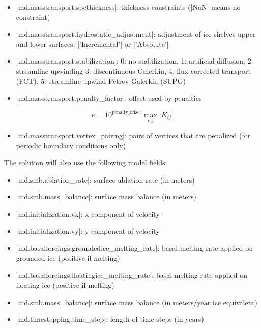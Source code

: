 \begin{itemize}
	\item \lstinlinebg|md.masstransport.spcthickness|: thickness constraints (\lstinlinebg|NaN| means no constraint)
	\item \lstinlinebg|md.masstransport.hydrostatic_adjustment|: adjustment of ice shelves upper and lower
		surfaces: \lstinlinebg|'Incremental'| or \lstinlinebg|'Absolute'|
	\item \lstinlinebg|md.masstransport.stabilization|: 0: no stabilization, 1: artificial diffusion, 2: streamline upwinding 3:
		discontinuous Galerkin, 4: flux corrected transport (FCT), 5: streamline upwind Petrov-Galerkin (SUPG)
	\item \lstinlinebg|md.masstransport.penalty_factor|: offset used by penalties
\end{itemize}
\begin{equation}
	\kappa=10^{\text{penalty\_offset}} \max_{i,j}\left| K_{ij}\right|
\end{equation}
\begin{itemize}
	\item \lstinlinebg|md.masstransport.vertex_pairing|: pairs of vertices that are penalized (for periodic
		boundary conditions only)
\end{itemize}

The solution will also use the following model fields:
\begin{itemize}
	\item \lstinlinebg|md.smb.ablation_rate|: surface ablation rate (in meters)
	\item \lstinlinebg|md.smb.mass_balance|: surface mass balance (in meters)
	\item \lstinlinebg|md.initialization.vx|: x component of velocity
	\item \lstinlinebg|md.initialization.vy|: y component of velocity
	\item \lstinlinebg|md.basalforcings.groundedice_melting_rate|: basal melting rate applied on grounded ice (positive if melting)
	\item \lstinlinebg|md.basalforcings.floatingice_melting_rate|: basal melting rate applied on floating ice (positive if melting)
	\item \lstinlinebg|md.smb.mass_balance|: surface mass balance (in meters/year ice equivalent)
	\item \lstinlinebg|md.timestepping.time_step|: length of time steps (in years)
\end{itemize}

